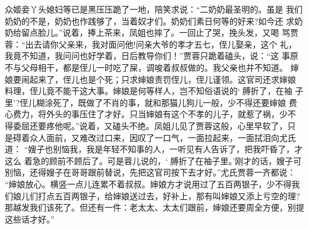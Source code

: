 众姬妾丫头媳妇等已是黑压压跪了一地，陪笑求说：“二奶奶最圣明的。虽是
我们奶奶的不是，奶奶也作践够了，当着奴才们。奶奶们素日何等的好来?如今还
求奶奶给留点脸儿。”说着，捧上茶来，凤姐也摔了。一回止了哭，挽头发，又喝
骂贾蓉：“出去请你父亲来，我对面问他!问亲大爷的孝才五七，侄儿娶亲，这个
礼，我竟不知道，我问问也好学着，日后教导你们！”贾蓉只跪着磕头，说：“这
事原不与父母相干，都是侄儿一时吃了屎，调唆着叔叔做的。我父亲也并不知道。
婶娘要闹起来了，侄儿也是个死；只求婶娘责罚侄儿，侄儿谨领。这官司还求婶娘
料理，侄儿竟不能干这大事。婶娘是何等样人，岂不知俗语说的‘膊折了，在袖
子里’?侄儿糊涂死了，既做了不肖的事，就和那猫儿狗儿一般，少不得还要婶娘
费心费力，将外头的事压住了才好。只当婶娘有这个不孝的儿子，就惹了祸，少不
得委屈还要疼他呢。”说着，又磕头不绝。凤姐儿见了贾蓉这般，心里早软了，只
是碍着众人面前，又难改过口来，因叹了一口气，一面拉起来，一面拭泪向尤氏道：
“嫂子也别恼我，我是年轻不知事的人，一听见有人告诉了，把我吓昏了，才这么
着急的顾前不顾后了。可是蓉儿说的，‘膊折了在袖子里。’刚才的话，嫂子可
别恼，还得嫂子在哥哥跟前替说，先把这官司按下去才好。”尤氏贾蓉一齐都说：
“婶娘放心。横竖一点儿连累不着叔叔。婶娘方才说用过了五百两银子，少不得我
们娘儿们打点五百两银子，给婶娘送过去，好补上，那有叫婶娘又添上亏空的理?
那越发我们该死了。但还有一件：老太太、太太们跟前，婶娘还要周全方便，别提
这些话才好。”

